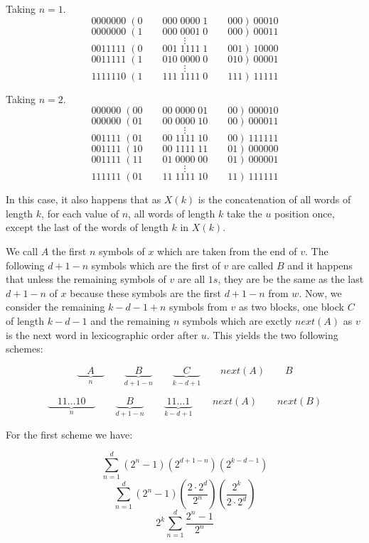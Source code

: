 \documentclass[11pt,a4paper]{tesis}
\theoremstyle{definition}
\begin{document}
Taking $n = 1$.
$$0000000\; (0 \qquad 000 \; 0000 \; 1 \qquad 000) \: 00010$$
$$0000000\; (1 \qquad 000 \; 0001 \; 0 \qquad 000) \: 00011$$
$$\vdots$$
$$0011111\; (0 \qquad 001 \; 1111 \; 1 \qquad 001) \: 10000$$
$$0011111\; (1 \qquad 010 \; 0000 \; 0 \qquad 010) \: 00001$$
$$\vdots$$
$$1111110\; (1 \qquad 111 \; 1111 \; 0 \qquad 111) \: 11111$$

Taking $n = 2$.
$$000000\; (00 \qquad 00 \; 0000 \; 01 \qquad 00) \: 000010$$
$$000000\; (01 \qquad 00 \; 0000 \; 10 \qquad 00) \: 000011$$
$$\vdots$$
$$001111\; (01 \qquad 00 \; 1111 \; 10 \qquad 00) \: 111111$$
$$001111\; (10 \qquad 00 \; 1111 \; 11 \qquad 01) \: 000000$$
$$001111\; (11 \qquad 01 \; 0000 \; 00 \qquad 01) \: 000001$$
$$\vdots$$
$$111111\; (01 \qquad 11 \; 1111 \; 10 \qquad 11) \: 111111$$

In this case, it also happens that as $X(k)$ is the concatenation of all words of length $k$, for each value of $n$, 
all words of length $k$ take the $u$ position once, except the last of the words of length $k$ in $X(k)$.

We call $A$ the first $n$ symbols of $x$ which are taken from the end of $v$. The following $d + 1 - n$ symbols which are the first of $v$ are called $B$ and it happens that unless the remaining symbols of $v$ are all $1s$, 
they are be the same as the last $d + 1 - n$ of $x$ because these symbols are the first $d + 1 - n$ from $w$.
Now, we consider the remaining $k - d - 1 + n$ symbols from $v$ as two blocks, one block $C$ of length $k - d - 1$ and the remaining $n$ symbols which are exctly $next(A)$ as $v$ is the next word in lexicographic order after $u$.
This yields the two following schemes:

$$\underbrace{\quad A \quad }_{n} \qquad \underbrace{\quad B \quad }_{d + 1 - n}  \qquad \underbrace{\quad C \quad }_{k-d+1} \qquad next(A) \qquad B$$

$$\underbrace{\quad 11\dots10 \quad }_{n} \qquad \underbrace{\quad B \quad }_{d + 1 - n}  \qquad \underbrace{\; 11\dots1 \; }_{k-d+1} \qquad next(A) \qquad next(B)$$

For the first scheme we have:

$$\sum_{n=1}^{d}(2^n - 1) (2^{d + 1 - n}) (2^{k - d - 1})$$
$$\sum_{n=1}^{d}(2^n - 1) (\frac{2 \cdot 2^d}{2^n})     (\frac{2^k}{2 \cdot 2^d})$$
$$ 2^k \sum_{n=1}^{d} \frac{2^n - 1}{2^n} $$

\end{document}
